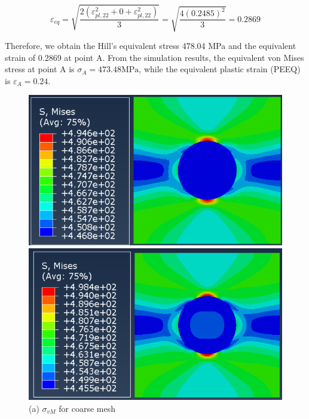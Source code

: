 \documentclass[12pt]{article}
\begin{document}
\begin{equation}
    \varepsilon_{eq} = \sqrt{\frac{2(\varepsilon_{pl,22}^2 + 0 + \varepsilon_{pl,22}^2)}{3}} = \sqrt{\frac{4(0.2485)^2}{3}} = 0.2869
\end{equation}

Therefore, we obtain the Hill's equivalent stress 478.04 MPa and the equivalent strain of
0.2869 at point A. From the simulation results, the equivalent von Mises stress at point A
is $\sigma_{A} = 473.48 \text{MPa}$, while the equivalent plastic strain (PEEQ) is 
$\varepsilon_{A} = 0.24$. 


    \begin{figure}[H]
    \centering
    \begin{minipage}{0.48\textwidth}
        \centering
        \includegraphics[width=\textwidth]{images/MISES_Coarse.png}
        \caption*{(a) $\sigma_{vM}$ for coarse mesh}
    \end{minipage}
    \hfill
    \begin{minipage}{0.48\textwidth}
        \centering
        \includegraphics[width=\textwidth]{images/MISES_Fine.png}

\end{minipage}
\end{figure}
\end{document}
